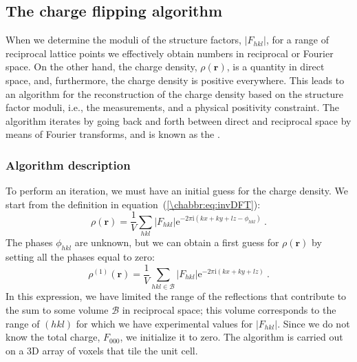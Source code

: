 \subsection{The charge flipping algorithm}\label{\chabbr:ssec:chargeflip}
When we determine the moduli of the structure factors, $\vert F_{hkl}\vert$, for a range of reciprocal lattice points we effectively obtain numbers in reciprocal or Fourier space. On the other hand, the charge density, $\rho(\mathbf{r})$, is a quantity in direct space, and, furthermore, the charge density is positive everywhere.  This leads to an algorithm for the reconstruction of the charge density based on the structure factor moduli, i.e., the measurements, and a physical positivity constraint.  The algorithm iterates by going back and forth between direct and reciprocal space by means of Fourier transforms, and is known as the .

\subsubsection{Algorithm description}
To perform an iteration, we must have an initial guess for the charge density. We start from the definition in equation~(\ref{\chabbr:eq:invDFT}):
\[
	\rho(\mathbf{r})=\frac{1}{V}\sum_{hkl}\vert F_{hkl}\vert\mathrm{e}^{-2\pi\mathrm{i}(kx+ky+lz-\phi_{hkl})}\ .
\]
The phases $\phi_{hkl}$ are unknown, but we can obtain a first guess for $\rho(\mathbf{r})$ by setting all the phases equal to zero:
\begin{equation}
	\rho^{(1)}(\mathbf{r})=\frac{1}{V}\sum_{hkl\in\mathcal{B}}\vert F_{hkl}\vert\mathrm{e}^{-2\pi\mathrm{i}(kx+ky+lz)}\ .
\end{equation}
In this expression, we have limited the range of the reflections that contribute to the sum to some volume $\mathcal{B}$ in reciprocal space; this volume corresponds to the range of $(hkl)$ for which we have experimental values for $\vert F_{hkl}\vert$. Since we do not know the total charge, $F_{000}$, we initialize it to zero.  The algorithm is carried out on a 3D array of voxels that tile the unit cell.

